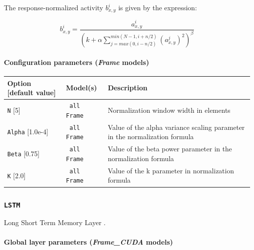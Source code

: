 \documentclass[a4paper,11pt,oneside]{article}
\begin{document}
The response-normalized activity $b_{x,y}^{i}$ is given by the expression:

\[ b_{x,y}^{i} = \frac{a_{x,y}^{i}}{\left(k + \alpha \sum\limits_{j=max(0,i-n/2)}^{min(N-1,i+n/2)}{\left(a_{x,y}^{j}\right)^2}\right)^{\beta}} \]

\paragraph{Configuration parameters (\emph{Frame} models)}

\begin{center}
 \begin{longtable}{| p{4cm} | p{3cm} | p{9cm} | }
 \hline
 Option [default value] & Model(s) & Description\\
 \hline\hline
  \lstinline!N! [5] & \lstinline! all Frame ! & Normalization window width in
  elements \\
  \lstinline!Alpha! [1.0e-4] & \lstinline! all Frame ! & Value of the alpha
  variance scaling parameter in the normalization formula \\
  \lstinline!Beta! [0.75] & \lstinline! all Frame ! & Value of the beta power
  parameter in the normalization formula \\
  \lstinline!K! [2.0] & \lstinline! all Frame ! & Value of the k parameter in
  normalization formula \\
 \hline
\end{longtable}
\end{center}

\subsubsection{\texorpdfstring{%
\lstinline[basicstyle=\ttfamily\bfseries]!LSTM!}{LSTM } }
Long Short Term Memory Layer \citep{LSTM1997}.

\paragraph{Global layer parameters (\emph{Frame\_CUDA} models)}
\end{document}
